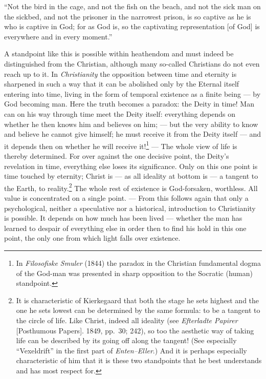 \documentclass[12pt,a4paper]{book}
\newcommand{\opage}[1]{\marginnote{\footnotesize\textit{[#1]}}}
\begin{document}
``Not the bird in the cage, and not the fish on the beach, and not the sick man on the sickbed,
and not the prisoner in the \opage{162}narrowest prison, is so captive as he is who is captive in God; for
as God is, so the captivating representation [of God] is everywhere and in every moment.''

A standpoint like this is possible within heathendom and must indeed be distinguished from the
Christian, although many so-called Christians do not even reach up to it. In \emph{Christianity}
the opposition between time and eternity is sharpened in such a way that it can be abolished only
by the Eternal itself entering into time, living in the form of temporal existence as a finite
being --- by God becoming man. Here the truth becomes a paradox: the Deity in time! Man can on
his way through time meet the Deity itself: everything depends on whether he then knows him and
believes on him; --- but the very ability to know and believe he cannot give himself; he must
receive it from the Deity itself --- and it depends then on whether he will receive
it!\footnote{In \emph{Filosofiske Smuler} (1844) the paradox in the Christian fundamental dogma
of the God-man was presented in sharp opposition to the Socratic (human) standpoint.} --- The
whole view of life is thereby determined. For over against the one decisive point, the Deity's
revelation in time, everything else loses its significance. Only on this one point is time
touched by eternity; Christ is --- as all ideality at bottom is --- a tangent to the Earth, to
reality.\footnote{It is characteristic of Kierkegaard that both the stage he sets highest and the
one he sets lowest can be determined by the same formula: to be a tangent to the circle of life.
Like Christ, indeed all ideality (see \emph{Efterladte Papirer} [Posthumous Papers]. 1849,
pp.~30; 242), so too the aesthetic way of taking life can be described by its going off along the
tangent! (See especially ``Vexeldrift'' in the first part of \emph{Enten--Eller}.) And it is
perhaps especially characteristic of him that it is these two standpoints that he best
understands and has most respect for.} The whole rest of existence is God-forsaken, worthless.
All value is concentrated on a single point. --- From this follows again that only a
psychological, neither a speculative nor a historical, introduction to Christianity is possible.
It depends on how much has been lived --- whether the man has learned to despair of everything
else in order then to find his hold in this one point, the only one from which light falls over
existence.
\end{document}
